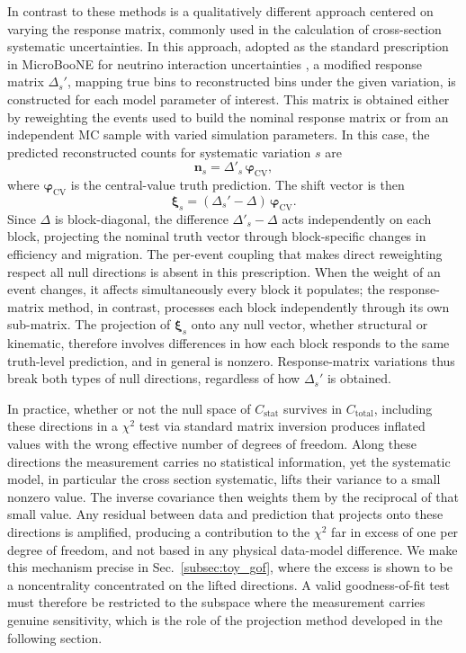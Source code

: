 \documentclass[a4paper,11pt]{article}
\begin{document}
In contrast to these methods is a qualitatively different approach centered on varying the response matrix, commonly used in the calculation of cross-section systematic uncertainties. In this approach, adopted as the standard prescription in MicroBooNE for neutrino interaction uncertainties \cite{Gardiner:2024gdy}, a modified response matrix $\Delta_{s}'$, mapping true bins to reconstructed bins under the given variation, is constructed for each model parameter of interest. This matrix is obtained either by reweighting the events used to build the nominal response matrix or from an independent MC sample with varied simulation parameters. In this case, the predicted reconstructed counts for systematic variation $s$ are
\begin{equation}
    \mathbf{n}_{s} = \Delta'_{s} \, \boldsymbol{\varphi}_{\text{CV}},
\end{equation}
where $\boldsymbol{\varphi}_{\text{CV}}$ is the central-value truth prediction. The shift vector is then
\begin{equation}
    \boldsymbol{\xi}_{s} = (\Delta_{s}' - \Delta) \, \boldsymbol{\varphi}_{\text{CV}}.
\end{equation}
Since $\Delta$ is block-diagonal, the difference $\Delta'_{s} - \Delta$ acts independently on each block, projecting the nominal truth vector through block-specific changes in efficiency and migration. The per-event coupling that makes direct reweighting respect all null directions is absent in this prescription. When the weight of an event changes, it affects simultaneously every block it populates; the response-matrix method, in contrast, processes each block independently through its own sub-matrix. The projection of $\boldsymbol{\xi}_{s}$ onto any null vector, whether structural or kinematic, therefore involves differences in how each block responds to the same truth-level prediction, and in general is nonzero. Response-matrix variations thus break both types of null directions, regardless of how $\Delta_{s}'$ is obtained.

In practice, whether or not the null space of $C_{\text{stat}}$ survives in $C_{\text{total}}$, including these directions in a $\chi^{2}$ test via standard matrix inversion produces inflated values with the wrong effective number of degrees of freedom. Along these directions the measurement carries no statistical information, yet the systematic model, in particular the cross section systematic, lifts their variance to a small nonzero value. The inverse covariance then weights them by the reciprocal of that small value. Any residual between data and prediction that projects onto these directions is amplified, producing a contribution to the $\chi^{2}$ far in excess of one per degree of freedom, and not based in any physical data-model difference. We make this mechanism precise in Sec.~\ref{subsec:toy_gof}, where the excess is shown to be a noncentrality concentrated on the lifted directions. A valid goodness-of-fit test must therefore be restricted to the subspace where the measurement carries genuine sensitivity, which is the role of the projection method developed in the following section.
\end{document}
